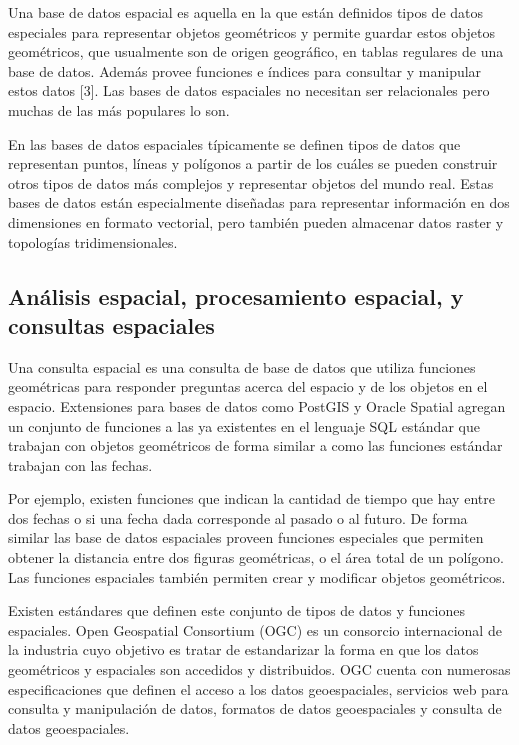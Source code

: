 Una base de datos espacial es aquella en la que están definidos tipos de datos especiales para representar objetos geométricos y permite guardar estos objetos geométricos, que usualmente son de origen geográfico, en tablas regulares de una base de datos. Además provee funciones e índices para consultar y manipular estos datos [3]. Las bases de datos espaciales no necesitan ser relacionales pero muchas de las más populares lo son.

En las bases de datos espaciales típicamente se definen tipos de datos que representan puntos, líneas y polígonos a partir de los cuáles se pueden construir otros tipos de datos más complejos y representar objetos del mundo real. Estas bases de datos están especialmente diseñadas para representar información en dos dimensiones en formato vectorial, pero también pueden almacenar datos raster y topologías tridimensionales.

\subsection{Análisis espacial, procesamiento espacial, y consultas espaciales}

Una consulta espacial es una consulta de base de datos que utiliza funciones geométricas para responder preguntas acerca del espacio y de los objetos en el espacio. Extensiones para bases de datos como PostGIS y Oracle Spatial agregan un conjunto de funciones a las ya existentes en el lenguaje SQL estándar que trabajan con objetos geométricos de forma similar a como las funciones estándar trabajan con las fechas.

Por ejemplo, existen funciones que indican la cantidad de tiempo que hay entre dos fechas o si una fecha dada corresponde al pasado o al futuro. De forma similar las base de datos espaciales proveen funciones especiales que permiten obtener la distancia entre dos figuras geométricas, o el área total de un polígono. Las funciones espaciales también permiten crear y modificar objetos geométricos.

Existen estándares que definen este conjunto de tipos de datos y funciones espaciales. Open Geospatial Consortium (OGC) es un consorcio internacional de la industria cuyo objetivo es tratar de estandarizar la forma en que los datos geométricos y espaciales son accedidos y distribuidos. OGC cuenta con numerosas especificaciones que definen el acceso a los datos geoespaciales, servicios web para consulta y manipulación de datos, formatos de datos geoespaciales y consulta de datos geoespaciales.


